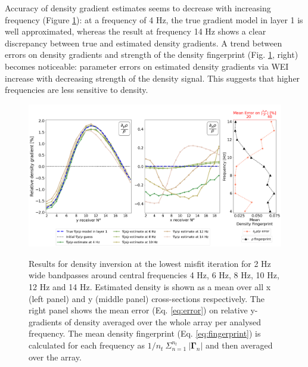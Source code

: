 \documentclass[]{article}
\begin{document}
	
	
	Accuracy of density gradient estimates seems to decrease with increasing frequency (Figure \ref{fig:freq_rho}): at a frequency of 4 Hz, the true gradient model in layer 1 is well approximated, whereas the result at frequency 14 Hz shows a clear discrepancy between true and estimated density gradients. 
	A  trend between errors on density gradients and strength of the density fingerprint (Fig. \ref{fig:freq_rho}, right) becomes noticeable: parameter errors on estimated density gradients via WEI increase with decreasing strength of the density signal. This suggests that higher frequencies are less sensitive to density. 
	  
	
	\begin{figure}[H] 
		\vspace{-0.5cm}
		\centering
		{\includegraphics[width =\textwidth, keepaspectratio]{../Figures/freq_study_RHOgrad_REL.png}}
		\caption{Results for density inversion at the lowest misfit iteration for 2 Hz wide bandpasses around central frequencies 4 Hz, 6 Hz, 8 Hz, 10 Hz, 12 Hz and 14 Hz. Estimated density is shown as a mean over all x (left panel) and y (middle panel) cross-sections respectively. The right panel shows the mean error (Eq. \ref{eq:error}) on relative y-gradients of density averaged over the whole array per analysed frequency. The mean density fingerprint (Eq. \ref{eq:fingerprint}) is calculated for each frequency as $ 1/n_{t} \: \Sigma_{n=1}^{n_{t}} \: |\bm{\Gamma}_{n}|$ and then averaged over the array.}\label{fig:freq_rho}
	\end{figure}
	
\end{document}
